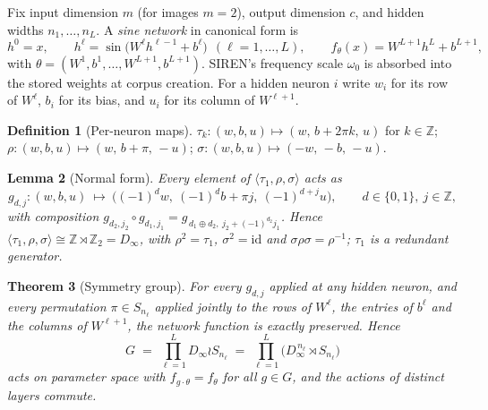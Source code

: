 \documentclass[10pt,letterpaper]{article}
\newtheorem{theorem}{Theorem}
\newtheorem{lemma}[theorem]{Lemma}
\theoremstyle{definition}
\newtheorem{definition}[theorem]{Definition}
\newcommand{\Z}{\mathbb{Z}}
\newcommand{\Dinf}{D_\infty}
\begin{document}
Fix input dimension $m$ (for images $m=2$), output dimension $c$, and hidden widths
$n_1,\dots,n_L$. A \emph{sine network} in canonical form is
\begin{equation}
h^0 = x, \qquad h^\ell = \sin\!\big(W^\ell h^{\ell-1} + b^\ell\big)\ \ (\ell = 1,\dots,L),
\qquad f_\theta(x) = W^{L+1} h^L + b^{L+1},
\label{eq:siren}
\end{equation}
with $\theta = (W^1,b^1,\dots,W^{L+1},b^{L+1})$. SIREN's frequency scale $\omega_0$
\citep{sitzmann2020siren} is absorbed into the stored weights at corpus creation. For a hidden
neuron $i$ write $w_i$ for its row of $W^\ell$, $b_i$ for its bias, and $u_i$ for its column of
$W^{\ell+1}$.

\begin{definition}[Per-neuron maps]\label{def:gen}
$\tau_k : (w,b,u) \mapsto (w,\, b + 2\pi k,\, u)$ for $k\in\Z$; \quad
$\rho : (w,b,u) \mapsto (w,\, b+\pi,\, -u)$; \quad
$\sigma : (w,b,u) \mapsto (-w,\, -b,\, -u)$.
\end{definition}

\begin{lemma}[Normal form]\label{lem:normal}
Every element of $\langle \tau_1,\rho,\sigma\rangle$ acts as
\begin{equation}
g_{d,j}\colon (w,b,u)\ \longmapsto\ \big((-1)^d w,\ (-1)^d b + \pi j,\ (-1)^{d+j} u\big),
\qquad d \in \{0,1\},\ j\in\Z,
\label{eq:normalform}
\end{equation}
with composition $g_{d_2,j_2}\circ g_{d_1,j_1} = g_{\,d_1\oplus d_2,\ j_2 + (-1)^{d_2} j_1}$.
Hence $\langle \tau_1,\rho,\sigma\rangle \cong \Z \rtimes \Z_2 = \Dinf$, with $\rho^2 = \tau_1$,
$\sigma^2 = \mathrm{id}$ and $\sigma\rho\sigma = \rho^{-1}$; $\tau_1$ is a redundant generator.
\end{lemma}

\begin{theorem}[Symmetry group]\label{thm:po1}
For every $g_{d,j}$ applied at any hidden neuron, and every permutation $\pi \in S_{n_\ell}$
applied jointly to the rows of $W^\ell$, the entries of $b^\ell$ and the columns of $W^{\ell+1}$,
the network function is exactly preserved. Hence
\begin{equation}
G \;=\; \prod_{\ell=1}^{L} \Dinf \wr S_{n_\ell}
    \;=\; \prod_{\ell=1}^{L} \big(\Dinf^{\,n_\ell} \rtimes S_{n_\ell}\big)
\end{equation}
acts on parameter space with $f_{g\cdot\theta} = f_\theta$ for all $g\in G$, and the actions of
distinct layers commute.
\end{theorem}
\end{document}

